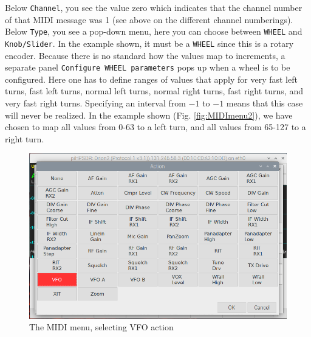 \documentclass[12pt]{book}
\def\rett#1{\texttt{\color{red}#1}}
\begin{document}
Below \rett{Channel}, you see the value zero which
indicates that the channel number of that MIDI message was 1 (see above on the
different channel numberings). Below \rett{Type}, you see a pop-down menu, here
you can choose between \rett{WHEEL} and \rett{Knob/Slider}. In the example shown,
it must be a \rett{WHEEL} since this is a rotary encoder. Because there is no
standard how the values map to increments, a separate panel
\rett{Configure WHEEL parameters} pops up when a wheel is to be configured.
Here one has to define ranges of values that apply for very fast left turns,
fast left turns, normal left turns, normal right turns, fast right turns,
and very fast right turns. Specifying an interval from $-1$ to $-1$ means that
this case will never be realized. In the example shown (Fig. \ref{fig:MIDImenu2}),
we have chosen to map all values from 0-63 to a left turn, and all values from 65-127
to a right turn.
\begin{figure}[ht!]
\center
\includegraphics[width=12cm]{MIDImenu3.png}
\caption{The MIDI menu, selecting VFO action}
\label{fig:MIDImenu3}
\end{figure}
 
\end{document}
